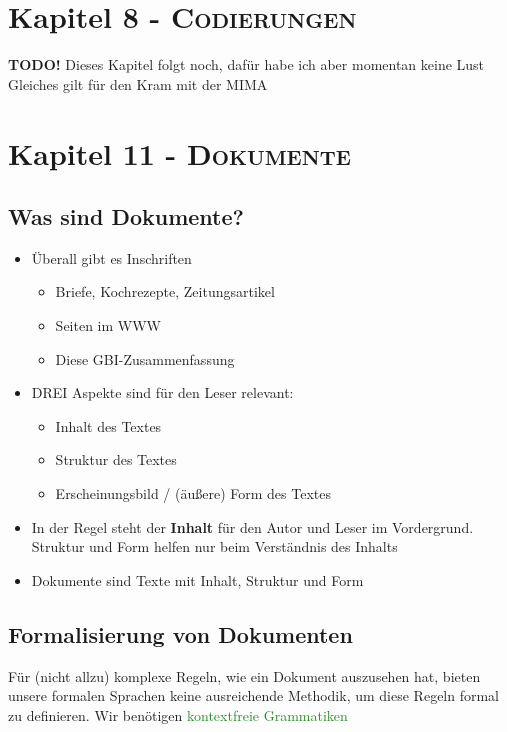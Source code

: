 \documentclass{article}
\newcommand{\kapitel}[2]{Kapitel #1 - \textsc{#2}}
\newcommand{\strongColor}[1]{\textcolor{strongColor}{#1}}
\newcommand{\strong}[1]{\textbf{\strongColor{#1}}}
\newcommand{\important}[1]{\textcolor{importantColor}{#1}}
\newcommand{\verweis}[1]{\textcolor{ForestGreen}{#1}}
\begin{document}
\newpage
\section{\kapitel{8}{Codierungen}}
\strong{TODO!} Dieses Kapitel folgt noch, dafür habe ich aber momentan keine Lust\\Gleiches gilt für den Kram mit der MIMA

\newpage
\section{\kapitel{11}{Dokumente}}
\subsection{Was sind Dokumente?}
\begin{itemize}
    \item Überall gibt es Inschriften
    \begin{itemize}
        \item Briefe, Kochrezepte, Zeitungsartikel
        \item Seiten im WWW
        \item Diese GBI-Zusammenfassung
    \end{itemize}
    \item DREI Aspekte sind für den Leser relevant:
    \begin{itemize}
        \item \important{Inhalt} des Textes
        \item \important{Struktur} des Textes
        \item \important{Erscheinungsbild} / (äußere) \important{Form} des Textes
    \end{itemize}
    \item In der Regel steht der \strong{Inhalt} für den Autor und Leser im Vordergrund.\\
    Struktur und Form helfen nur beim Verständnis des Inhalts
    \item \important{Dokumente} sind Texte mit Inhalt, Struktur und Form
\end{itemize}
\subsection{Formalisierung von Dokumenten}
Für (nicht allzu) komplexe Regeln, wie ein Dokument auszusehen hat, bieten unsere formalen Sprachen keine ausreichende Methodik, um diese Regeln formal zu definieren. Wir benötigen \verweis{kontextfreie Grammatiken} 
\end{document}
